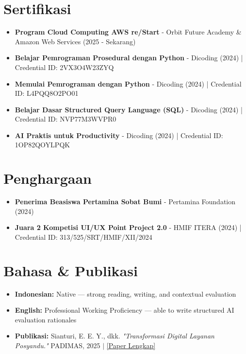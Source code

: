 \section*{Sertifikasi}
\begin{itemize}
  \item \textbf{Program Cloud Computing AWS re/Start} - Orbit Future Academy \& Amazon Web Services (2025 - Sekarang)
  \item \textbf{Belajar Pemrograman Prosedural dengan Python} - Dicoding (2024) | Credential ID: 2VX3O4W23ZYQ
  \item \textbf{Memulai Pemrograman dengan Python} - Dicoding (2024) | Credential ID: L4PQQ8O2PO01
  \item \textbf{Belajar Dasar Structured Query Language (SQL)} - Dicoding (2024) | Credential ID: NVP77M3WVPR0
  \item \textbf{AI Praktis untuk Productivity} - Dicoding (2024) | Credential ID: 1OP82QOYLPQK
\end{itemize}

\section*{Penghargaan}
\begin{itemize}
  \item \textbf{Penerima Beasiswa Pertamina Sobat Bumi} - Pertamina Foundation (2024)
  \item \textbf{Juara 2 Kompetisi UI/UX Point Project 2.0} - HMIF ITERA (2024) | Credential ID: 313/525/SRT/HMIF/XII/2024
\end{itemize}

\section*{Bahasa \& Publikasi}
\begin{itemize}
  \item \textbf{Indonesian:} Native — strong reading, writing, and contextual evaluation
  \item \textbf{English:} Professional Working Proficiency — able to write structured AI evaluation rationales
  \item \textbf{Publikasi:} Sianturi, E. E. Y., dkk. \textit{"Transformasi Digital Layanan Posyandu."} PADIMAS, 2025 $|$ \href{https://jurnal.mdp.ac.id/index.php/padimas/article/view/12206}{\footnotesize [Paper Lengkap]}
\end{itemize}
